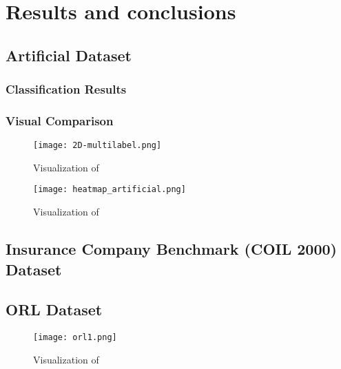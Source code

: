 
\chapter{Results and conclusions}

\section{Artificial Dataset}

\subsection{Classification Results}

\subsection{Visual Comparison}

\begin{figure}
    \centering
    \texttt{[image: 2D-multilabel.png]}
    \caption{Visualization of }
    \label{fig:2D_multilabel}
\end{figure}

\begin{figure}
    \centering
    \texttt{[image: heatmap\_artificial.png]}
    \caption{Visualization of }
    \label{fig:heatmap}
\end{figure}

\section{Insurance Company Benchmark (COIL 2000) Dataset}

\section{ORL Dataset}

\begin{figure}
    \centering
    \texttt{[image: orl1.png]}
    \caption{Visualization of }
    \label{fig:orl}
\end{figure}